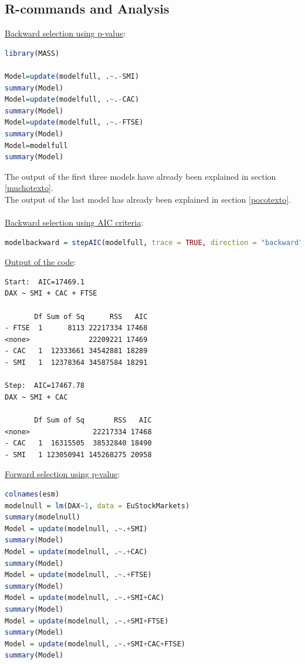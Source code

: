 \documentclass[a4paper, 11pt]{article}
\begin{document}
\subsection{R-commands and Analysis}
\underline{Backward selection using p-value}:
\begin{lstlisting}[language=R]
library(MASS)

Model=update(modelfull, .~.-SMI)
summary(Model)
Model=update(modelfull, .~.-CAC)
summary(Model)
Model=update(modelfull, .~.-FTSE)
summary(Model)
Model=modelfull
summary(Model)
\end{lstlisting}
The output of the first three models have already been explained in section \textcolor{blue}{\ref{muchotexto}}.\\
The output of the last model has already been explained in section \textcolor{blue}{\ref{pocotexto}}.\\
\vspace{2em}
\\\underline{Backward selection using AIC criteria}:
\begin{lstlisting}[language=R]
modelbackward = stepAIC(modelfull, trace = TRUE, direction = "backward")
\end{lstlisting}
\vspace{1em}
\underline{Output of the code}:
\small\begin{verbatim}
Start:  AIC=17469.1
DAX ~ SMI + CAC + FTSE

       Df Sum of Sq      RSS   AIC
- FTSE  1      8113 22217334 17468
<none>              22209221 17469
- CAC   1  12333661 34542881 18289
- SMI   1  12378364 34587584 18291

Step:  AIC=17467.78
DAX ~ SMI + CAC

       Df Sum of Sq       RSS   AIC
<none>               22217334 17468
- CAC   1  16315505  38532840 18490
- SMI   1 123050941 145268275 20958
\end{verbatim}
\newpage
\hspace{-1.5em}\underline{Forward selection using p-value}:
\begin{lstlisting}[language=R]
colnames(esm)
modelnull = lm(DAX~1, data = EuStockMarkets)
summary(modelnull)
Model = update(modelnull, .~.+SMI)
summary(Model)
Model = update(modelnull, .~.+CAC)
summary(Model)
Model = update(modelnull, .~.+FTSE)
summary(Model)
Model = update(modelnull, .~.+SMI+CAC)
summary(Model)
Model = update(modelnull, .~.+SMI+FTSE)
summary(Model)
Model = update(modelnull, .~.+SMI+CAC+FTSE)
summary(Model)
\end{lstlisting}
\end{document}
